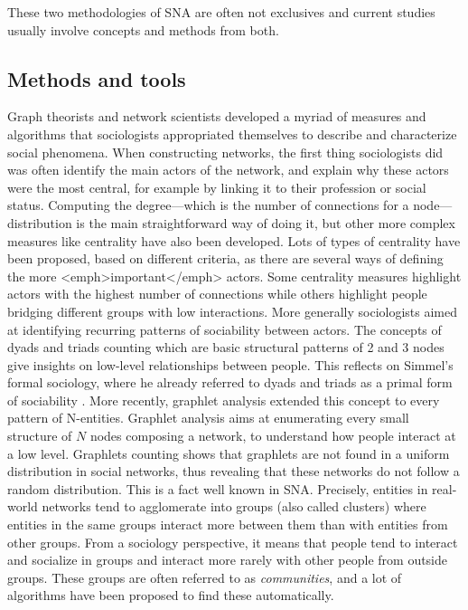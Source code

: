 These two methodologies of SNA are often not exclusives and current studies usually involve concepts and methods from both.

\subsection{Methods and tools}\label{subsec:methods-dans-tools}

Graph theorists and network scientists developed a myriad of measures and algorithms that sociologists appropriated themselves to describe and characterize social phenomena.
When constructing networks, the first thing sociologists did was often identify the main actors of the network, and explain why these actors were the most central, for example by linking it to their profession or social status.
Computing the degree---which is the number of connections for a node---distribution is the main straightforward way of doing it, but other more complex measures like centrality have also been developed.
Lots of types of centrality have been proposed, based on different criteria, as there are several ways of defining the more <emph>important</emph> actors.
Some centrality measures highlight actors with the highest number of connections while others highlight people bridging different groups with low interactions.
More generally sociologists aimed at identifying recurring patterns of sociability between actors.
The concepts of dyads and triads counting which are basic structural patterns of 2 and 3 nodes give insights on low-level relationships between people.
This reflects on Simmel's formal sociology, where he already referred to dyads and triads as a primal form of sociability \cite{simmel2013}.
More recently, graphlet analysis extended this concept to every pattern of N-entities.
Graphlet analysis aims at enumerating every small structure of $N$ nodes composing a network, to understand how people interact at a low level.
Graphlets counting shows that graphlets are not found in a uniform distribution in social networks, thus revealing that these networks do not follow a random distribution.
This is a fact well known in SNA. Precisely, entities in real-world networks tend to agglomerate into groups (also called clusters) where entities in the same groups interact more between them than with entities from other groups.
From a sociology perspective, it means that people tend to interact and socialize in groups and interact more rarely with other people from outside groups.
These groups are often referred to as \emph{communities}, and a lot of algorithms have been proposed to find these automatically.

